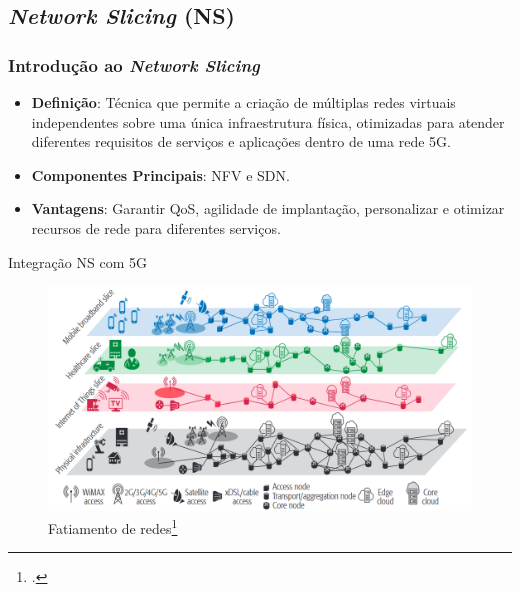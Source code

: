 \subsection{\textit{Network Slicing} (NS)}
\begin{frame}
    \frametitle{Introdução ao \textit{Network Slicing}}
    \begin{itemize}
        \item \textbf{Definição}: Técnica que permite a criação de múltiplas redes virtuais independentes sobre uma única infraestrutura física, otimizadas para atender diferentes requisitos de serviços e aplicações dentro de uma rede 5G.
        \item \textbf{Componentes Principais}: NFV e SDN.
        \item \textbf{Vantagens}: Garantir QoS, agilidade de implantação, personalizar e otimizar recursos de rede para diferentes serviços.
    \end{itemize}
\end{frame}

\begin{frame}{Integração NS com 5G}
    \begin{figure}[h]
        \centering
        \includegraphics[width=\textwidth]{figs/Network_Slicing.png}
        \caption{Fatiamento de redes\footcite{Network_Slicing}}
    \end{figure}
\end{frame}